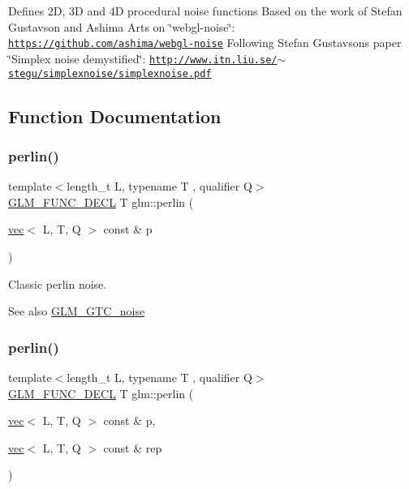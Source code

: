 Defines 2D, 3D and 4D procedural noise functions Based on the work of Stefan Gustavson and Ashima Arts on \char`\"{}webgl-\/noise\char`\"{}\+: \href{https://github.com/ashima/webgl-noise}{\tt https\+://github.\+com/ashima/webgl-\/noise} Following Stefan Gustavson\textquotesingle{}s paper \char`\"{}\+Simplex noise demystified\char`\"{}\+: \href{http://www.itn.liu.se/~stegu/simplexnoise/simplexnoise.pdf}{\tt http\+://www.\+itn.\+liu.\+se/$\sim$stegu/simplexnoise/simplexnoise.\+pdf} 

\subsection{Function Documentation}
\mbox{\label{group__gtc__noise_ga1e043ce3b51510e9bc4469227cefc38a}} 
\subsubsection{\texorpdfstring{perlin()}{perlin()}\hspace{0.1cm}{\footnotesize\ttfamily [1/2]}}
{\footnotesize\ttfamily template$<$length\+\_\+t L, typename T , qualifier Q$>$ \\
\mbox{\hyperlink{setup_8hpp_ab2d052de21a70539923e9bcbf6e83a51}{G\+L\+M\+\_\+\+F\+U\+N\+C\+\_\+\+D\+E\+CL}} T glm\+::perlin (\begin{DoxyParamCaption}\item[{\mbox{\hyperlink{structglm_1_1vec}{vec}}$<$ L, T, Q $>$ const \&}]{p }\end{DoxyParamCaption})}

Classic perlin noise. \begin{DoxySeeAlso}{See also}
\mbox{\hyperlink{group__gtc__noise}{G\+L\+M\+\_\+\+G\+T\+C\+\_\+noise}} 
\end{DoxySeeAlso}
\mbox{\label{group__gtc__noise_gac270edc54c5fc52f5985a45f940bb103}} 
\subsubsection{\texorpdfstring{perlin()}{perlin()}\hspace{0.1cm}{\footnotesize\ttfamily [2/2]}}
{\footnotesize\ttfamily template$<$length\+\_\+t L, typename T , qualifier Q$>$ \\
\mbox{\hyperlink{setup_8hpp_ab2d052de21a70539923e9bcbf6e83a51}{G\+L\+M\+\_\+\+F\+U\+N\+C\+\_\+\+D\+E\+CL}} T glm\+::perlin (\begin{DoxyParamCaption}\item[{\mbox{\hyperlink{structglm_1_1vec}{vec}}$<$ L, T, Q $>$ const \&}]{p,  }\item[{\mbox{\hyperlink{structglm_1_1vec}{vec}}$<$ L, T, Q $>$ const \&}]{rep }\end{DoxyParamCaption})}

